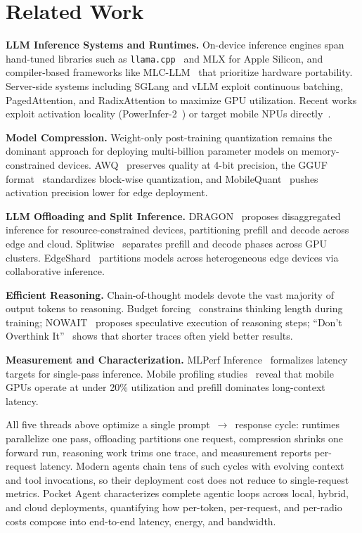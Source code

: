 \documentclass[sigconf,anonymous,review]{acmart}
\begin{document}
\section{Related Work}
\label{sec:related}

\noindent \textbf{LLM Inference Systems and Runtimes.}
On-device inference engines span hand-tuned libraries such as \texttt{llama.cpp}~\cite{llamacpp} and MLX for Apple Silicon, and compiler-based frameworks like MLC-LLM~\cite{mlc-llm} that prioritize hardware portability.
Server-side systems including SGLang and vLLM exploit continuous batching, PagedAttention, and RadixAttention to maximize GPU utilization.
Recent works exploit activation locality (PowerInfer-2~\cite{powerinfer2}) or target mobile NPUs directly~\cite{llm-npu2024}.

\noindent \textbf{Model Compression.}
Weight-only post-training quantization remains the dominant approach for deploying multi-billion parameter models on memory-constrained devices.
AWQ~\cite{awq2023} preserves quality at 4-bit precision, the GGUF format~\cite{gguf2024} standardizes block-wise quantization, and MobileQuant~\cite{mobilequant2025} pushes activation precision lower for edge deployment.

\noindent \textbf{LLM Offloading and Split Inference.}
DRAGON~\cite{dragon2025} proposes disaggregated inference for resource-constrained devices, partitioning prefill and decode across edge and cloud.
Splitwise~\cite{splitwise2024} separates prefill and decode phases across GPU clusters.
EdgeShard~\cite{edgeshard2024} partitions models across heterogeneous edge devices via collaborative inference.

\noindent \textbf{Efficient Reasoning.}
Chain-of-thought models devote the vast majority of output tokens to reasoning.
Budget forcing~\cite{budgetforcing2025} constrains thinking length during training;
NOWAIT~\cite{nowait2025} proposes speculative execution of reasoning steps;
``Don't Overthink It''~\cite{dontoverthink2025} shows that shorter traces often yield better results.

\noindent \textbf{Measurement and Characterization.}
MLPerf Inference~\cite{mlperf-inference2025} formalizes latency targets for single-pass inference.
Mobile profiling studies~\cite{xiao2025understandinglargelanguagemodels,llm-npu2024} reveal that mobile GPUs operate at under 20\% utilization and prefill dominates long-context latency.

\medskip
All five threads above optimize a single prompt~$\rightarrow$~response cycle: runtimes parallelize one pass, offloading partitions one request, compression shrinks one forward run, reasoning work trims one trace, and measurement reports per-request latency.
Modern agents chain tens of such cycles with evolving context and tool invocations, so their deployment cost does not reduce to single-request metrics.
Pocket Agent characterizes complete agentic loops across local, hybrid, and cloud deployments, quantifying how per-token, per-request, and per-radio costs compose into end-to-end latency, energy, and bandwidth.
\end{document}
